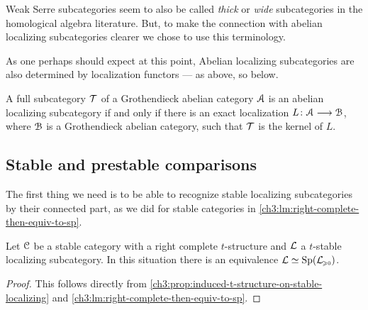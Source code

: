 \begin{remark}
    Weak Serre subcategories seem to also be called \emph{thick} or \emph{wide} subcategories in the homological algebra literature. But, to make the connection with abelian localizing subcategories clearer we chose to use this terminology. 
\end{remark}

As one perhaps should expect at this point, Abelian localizing subcategories are also determined by localization functors --- as above, so below. 

\begin{proposition}
    \label{ch3:prop:abelian-localizing-iff-kernel-of-localization}
    A full subcategory $\mathcal{T}$ of a Grothendieck abelian category $\EuScript{A}$ is an abelian localizing subcategory if and only if there is an exact localization $L\colon\EuScript{A}\longrightarrow \EuScript{B}$, where $\EuScript{B}$ is a Grothendieck abelian category, such that $\mathcal{T}$ is the kernel of $L$. 
\end{proposition}







\subsection{Stable and prestable comparisons}

The first thing we need is to be able to recognize stable localizing subcategories by their connected part, as we did for stable categories in \cref{ch3:lm:right-complete-then-equiv-to-sp}. 

\begin{corollary}
    \label{ch3:cor:t-stable-implies-equiv-to-sp}
    Let $\EuScript{C}$ be a stable category with a right complete $t$-structure and $\mathcal{L}$ a $t$-stable localizing subcategory. In this situation there is an equivalence $\mathcal{L}\simeq \mathrm{Sp}(\mathcal{L}_{\hspace{-1pt}\scriptscriptstyle\geqslant 0})$. 
\end{corollary}
\begin{proof}
    This follows directly from \cref{ch3:prop:induced-t-structure-on-stable-localizing} and \cref{ch3:lm:right-complete-then-equiv-to-sp}.
\end{proof}

